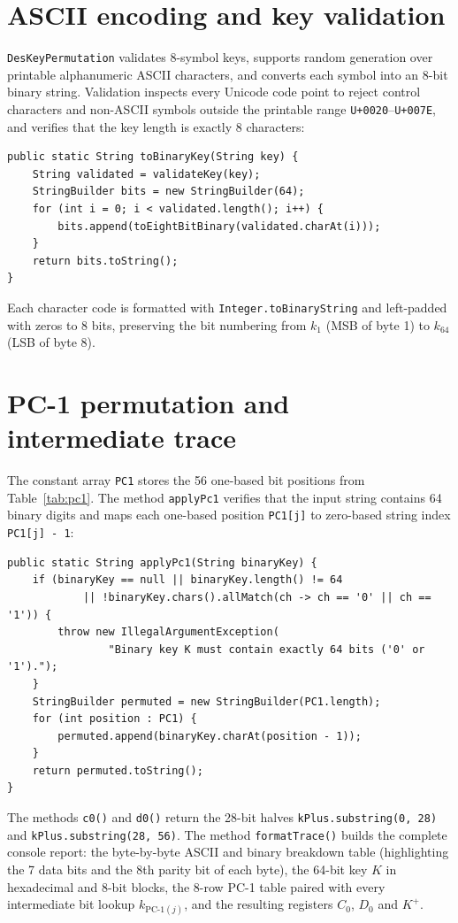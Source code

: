 \documentclass{utmreport}
\begin{document}
\section{ASCII encoding and key validation}
\texttt{DesKeyPermutation} validates 8-symbol keys, supports random generation over printable alphanumeric ASCII characters, and converts each symbol into an 8-bit binary string. Validation inspects every Unicode code point to reject control characters and non-ASCII symbols outside the printable range \texttt{U+0020}--\texttt{U+007E}, and verifies that the key length is exactly 8 characters:
\begin{lstlisting}
public static String toBinaryKey(String key) {
    String validated = validateKey(key);
    StringBuilder bits = new StringBuilder(64);
    for (int i = 0; i < validated.length(); i++) {
        bits.append(toEightBitBinary(validated.charAt(i)));
    }
    return bits.toString();
}
\end{lstlisting}
Each character code is formatted with \texttt{Integer.toBinaryString} and left-padded with zeros to 8 bits, preserving the bit numbering from $k_1$ (MSB of byte 1) to $k_{64}$ (LSB of byte 8).

\section{PC-1 permutation and intermediate trace}
The constant array \texttt{PC1} stores the 56 one-based bit positions from Table~\ref{tab:pc1}. The method \texttt{applyPc1} verifies that the input string contains 64 binary digits and maps each one-based position \texttt{PC1[j]} to zero-based string index \texttt{PC1[j] - 1}:
\begin{lstlisting}
public static String applyPc1(String binaryKey) {
    if (binaryKey == null || binaryKey.length() != 64
            || !binaryKey.chars().allMatch(ch -> ch == '0' || ch == '1')) {
        throw new IllegalArgumentException(
                "Binary key K must contain exactly 64 bits ('0' or '1').");
    }
    StringBuilder permuted = new StringBuilder(PC1.length);
    for (int position : PC1) {
        permuted.append(binaryKey.charAt(position - 1));
    }
    return permuted.toString();
}
\end{lstlisting}
The methods \texttt{c0()} and \texttt{d0()} return the 28-bit halves \texttt{kPlus.substring(0, 28)} and \texttt{kPlus.substring(28, 56)}. The method \texttt{formatTrace()} builds the complete console report: the byte-by-byte ASCII and binary breakdown table (highlighting the 7 data bits and the 8th parity bit of each byte), the 64-bit key $K$ in hexadecimal and 8-bit blocks, the 8-row PC-1 table paired with every intermediate bit lookup $k_{\text{PC-1}(j)}$, and the resulting registers $C_0$, $D_0$ and $K^+$.
\end{document}
